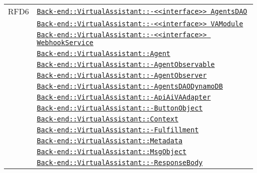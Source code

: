 \begin{longtable}{|>{\centering}m{3cm}|m{10cm}<{\centering}|}
RFD6 & \hyperref[Back-end::VirtualAssistant::<<interface>> AgentsDAO]{\texttt{Back-end::VirtualAssistant::-\linebreak <<interface>> AgentsDAO}}\\
& \hyperref[Back-end::VirtualAssistant::<<interface>> VAModule]{\texttt{Back-end::VirtualAssistant::-\linebreak <<interface>> VAModule}}\\
& \hyperref[Back-end::VirtualAssistant::<<interface>> WebhookService]{\texttt{Back-end::VirtualAssistant::-\linebreak <<interface>> WebhookService}}\\
& \hyperref[Back-end::VirtualAssistant::Agent]{\texttt{Back-end::VirtualAssistant::Agent}}\\
& \hyperref[Back-end::VirtualAssistant::AgentObservable]{\texttt{Back-end::VirtualAssistant::-\linebreak AgentObservable}}\\
& \hyperref[Back-end::VirtualAssistant::AgentObserver]{\texttt{Back-end::VirtualAssistant::-\linebreak AgentObserver}}\\
& \hyperref[Back-end::VirtualAssistant::AgentsDAODynamoDB]{\texttt{Back-end::VirtualAssistant::-\linebreak AgentsDAODynamoDB}}\\
& \hyperref[Back-end::VirtualAssistant::ApiAiVAAdapter]{\texttt{Back-end::VirtualAssistant::-\linebreak ApiAiVAAdapter}}\\
& \hyperref[Back-end::VirtualAssistant::ButtonObject]{\texttt{Back-end::VirtualAssistant::-\linebreak ButtonObject}}\\
& \hyperref[Back-end::VirtualAssistant::Context]{\texttt{Back-end::VirtualAssistant::Context}}\\
& \hyperref[Back-end::VirtualAssistant::Fulfillment]{\texttt{Back-end::VirtualAssistant::-\linebreak Fulfillment}}\\
& \hyperref[Back-end::VirtualAssistant::Metadata]{\texttt{Back-end::VirtualAssistant::Metadata}}\\
& \hyperref[Back-end::VirtualAssistant::MsgObject]{\texttt{Back-end::VirtualAssistant::MsgObject}}\\
& \hyperref[Back-end::VirtualAssistant::ResponseBody]{\texttt{Back-end::VirtualAssistant::-\linebreak ResponseBody}}\\

\end{longtable}
